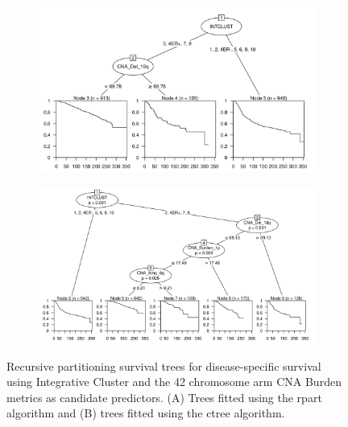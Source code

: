 \begin{figure}[!h]
\centering

\vspace{0.5cm}

\begin{subfigure}{\textwidth}
\subcaption{}
\includegraphics[width=1\textwidth]{../figures/Chapter_3/PA_PartyKit_Survival_Burden_DSS_INTCLUST.png}
\end{subfigure}

\vspace{2cm}

\begin{subfigure}{\textwidth}
\subcaption{}
\includegraphics[width=1\textwidth]{../figures/Chapter_3/PA_Ctree_Survival_Burden_DSS_INTCLUST.png}
\end{subfigure}

\vspace{0.5cm}

\caption[Recursive partitioning survival trees for disease-specific survival using Integrative Cluster and the 42 chromosome arm CNA Burden metrics as candidate predictors.]{Recursive partitioning survival trees for disease-specific survival using Integrative Cluster and the 42 chromosome arm CNA Burden metrics as candidate predictors. (A) Trees fitted using the rpart algorithm and (B) trees fitted using the ctree algorithm.}
\label{fig:INTCLUST_PA_CNA_Burden_DSS}
\end{figure}

